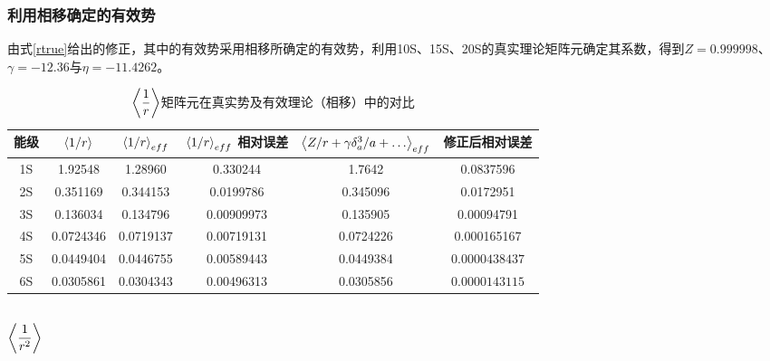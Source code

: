 \documentclass[hyperref,cs4size,titlepage,twoside]{ctexart}
\begin{document}
\subsubsection{利用相移确定的有效势}
由式\eqref{rtrue}给出的修正，其中的有效势采用相移所确定的有效势，利用10S、15S、20S的真实理论矩阵元确定其系数，得到$Z=0.999998$、$\gamma=-12.36$与$\eta=-11.4262$。
\begin{table}[!hbtp]
  \centering
  \begin{tabular}{|cccccc|}
    \hline
    能级 & $\expval{1/r}$ & $\expval{1/r}_{eff}$ & $\expval{1/r}_{eff}$ 相对误差& $\expval{Z/r+\gamma \delta^3_a/a+\dots}_{eff}$ & 修正后相对误差 \\
    \hline
    1S & 1.92548 & 1.28960 &0.330244& 1.7642&0.0837596 \\
    2S & 0.351169 & 0.344153 &0.0199786& 0.345096&0.0172951 \\
    3S & 0.136034 & 0.134796 &0.00909973& 0.135905&0.00094791 \\
    4S & 0.0724346 & 0.0719137 &0.00719131& 0.0724226&0.000165167 \\
    5S & 0.0449404 & 0.0446755 &0.00589443& 0.0449384&$0.0000438437$ \\
    6S & 0.0305861 & 0.0304343 &0.00496313& 0.0305856&$0.0000143115$ \\
    \hline
  \end{tabular}
  \caption{$\displaystyle\expval{\frac{1}{r}}$矩阵元在真实势及有效理论（相移）中的对比}\label{evr1}
\end{table}
\subsection{$\displaystyle\expval{\frac{1}{r^2}}$}
\end{document}
